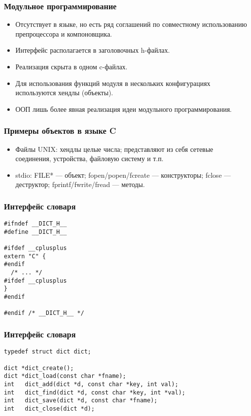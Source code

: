 \documentclass[hyperref={unicode=true}]{beamer}
\begin{document}
\begin{frame}
\frametitle{Модульное программирование}
\begin{itemize}
\item Отсутствует в языке, но есть ряд соглашений по совместному использованию
  препроцессора и компоновщика.
\item Интерфейс располагается в заголовочных h-файлах.
\item Реализация скрыта в одном c-файлах. 
\item Для использования функций модуля в нескольких конфигурациях
  используются хендлы (объекты). 
\item ООП лишь более явная реализация идеи модульного
  программирования. 
\end{itemize}
\end{frame}

\begin{frame}
\frametitle{Примеры объектов в языке C}
\begin{itemize}
\item Файлы UNIX: хендлы целые числа; представляют из себя сетевые
  соединения, устройства, файловую систему и т.п.
\item stdio: FILE* --- объект; fopen/popen/fcreate --- конструкторы;
  fclose --- деструктор; fprintf/fwrite/fread --- методы. 
\end{itemize}
\end{frame}

\begin{frame}[fragile]
\frametitle{Интерфейс словаря}
\begin{lstlisting}
#ifndef __DICT_H__
#define __DICT_H__

#ifdef __cplusplus
extern "C" {
#endif
  /* ... */
#ifdef __cplusplus
}
#endif

#endif /* __DICT_H__ */
\end{lstlisting}
\end{frame}

\begin{frame}[fragile]
\frametitle{Интерфейс словаря}
\begin{lstlisting}
typedef struct dict dict;

dict *dict_create();
dict *dict_load(const char *fname);
int   dict_add(dict *d, const char *key, int val);
int   dict_find(dict *d, const char *key, int *val);
int   dict_save(dict *d, const char *fname);
int   dict_close(dict *d);

\end{lstlisting}
\end{frame}
\end{document}

